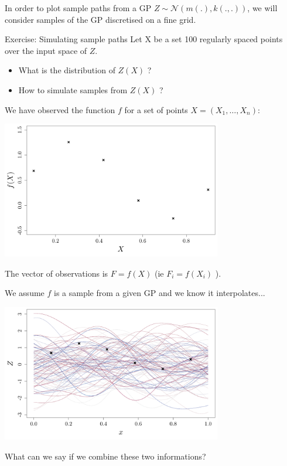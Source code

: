 \documentclass{beamer}
\begin{document}
\begin{frame}{}
\vspace{5mm}
In order to plot sample paths from a GP $Z \sim \mathcal{N}(m(.),k(.,.))$, we will consider samples of the GP discretised on a fine grid.
\vspace{5mm}
\begin{exampleblock}{Exercise: Simulating sample paths}
Let X be a set 100 regularly spaced points over the input space of $Z$.
\begin{itemize}
	\item What is the distribution of $Z(X)$ ?
	\item How to simulate samples from $Z(X)$ ?
\end{itemize}
\end{exampleblock}
\end{frame}

\begin{frame}{}
We have observed the function $f$ for a set of points $X = (X_1,\dots,X_n)$:
\begin{center}
\includegraphics[height=6cm]{figures/R/GPR_obs}
\end{center}
The vector of observations is $F=f(X)$ (ie $F_i = f(X_i)$ ).
\end{frame}

\begin{frame}{}
We assume $f$ is a sample from a given GP and we know it interpolates... 
\begin{center}
\includegraphics[height=6cm]{figures/R/GPR_GaussBoth}
\end{center}
What can we say if we combine these two informations?
\end{frame}
\end{document}

